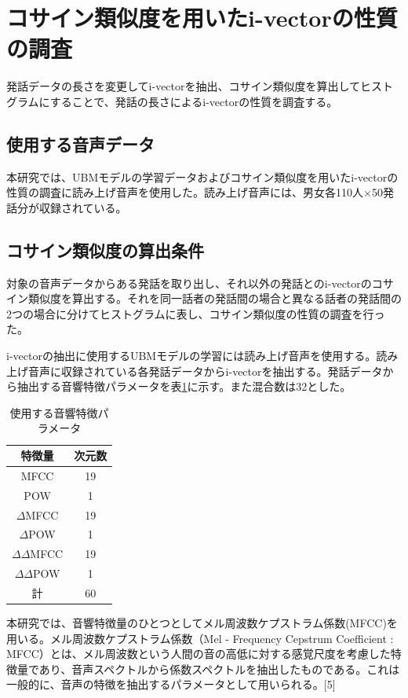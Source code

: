 \section{コサイン類似度を用いたi-vectorの性質の調査}
\label{section:pre_cos}
発話データの長さを変更してi-vectorを抽出、コサイン類似度を算出してヒストグラムにすることで、発話の長さによるi-vectorの性質を調査する。
\subsection{使用する音声データ}
本研究では、UBMモデルの学習データおよびコサイン類似度を用いたi-vectorの性質の調査に読み上げ音声\cite{ATR}を使用した。読み上げ音声には、男女各110人×50発話分が収録されている。

\subsection{コサイン類似度の算出条件}
対象の音声データからある発話を取り出し、それ以外の発話とのi-vectorのコサイン類似度を算出する。それを同一話者の発話間の場合と異なる話者の発話間の2つの場合に分けてヒストグラムに表し、コサイン類似度の性質の調査を行った。\par
i-vectorの抽出に使用するUBMモデルの学習には読み上げ音声\cite{ATR}を使用する。読み上げ音声に収録されている各発話データからi-vectorを抽出する。発話データから抽出する音響特徴パラメータを表\ref{iv_feature}に示す。また混合数は32とした。

\begin{table}[H]
  \begin{center}
    \caption{使用する音響特徴パラメータ}
    \label{iv_feature}
    \begin{tabular}{|c||c|} \hline
      特徴量 & 次元数\\ \hline
      MFCC & 19  \\ 
      POW & 1  \\ 
      $\Delta$MFCC & 19 \\ 
      $\Delta$POW & 1 \\ 
      $\Delta\Delta$MFCC & 19 \\ 
      $\Delta\Delta$POW & 1 \\ \hline
      計 & 60 \\ \hline
    \end{tabular}
  \end{center}
\end{table}

本研究では、音響特徴量のひとつとしてメル周波数ケプストラム係数(MFCC)を用いる。メル周波数ケプストラム係数（Mel - Frequency Cepstrum Coefficient : MFCC）とは、メル周波数という人間の音の高低に対する感覚尺度を考慮した特徴量であり、音声スペクトルから係数スペクトルを抽出したものである。これは一般的に、音声の特徴を抽出するパラメータとして用いられる。[5]


